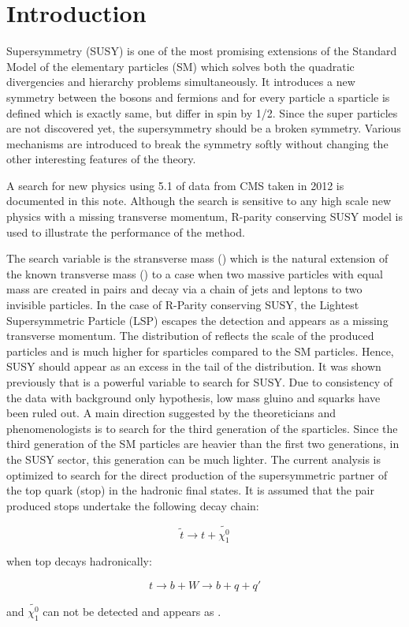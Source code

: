 \section{Introduction}
\label{sect:introduction}
Supersymmetry \cite{Martin:1997ns} (SUSY) is one of the most promising extensions of the 
Standard Model of the elementary particles (SM) which solves both the 
quadratic divergencies and hierarchy problems simultaneously. It introduces a new symmetry between the bosons and fermions and 
for every particle a sparticle is defined which is exactly same, but differ in spin by 1/2.
Since the super particles are not discovered yet, the supersymmetry should be a broken symmetry. Various mechanisms are introduced to 
break the symmetry softly without changing the other interesting features of the theory.

A search for new physics using 5.1 \invfb of data from CMS taken in 2012 is documented in this note. Although the search is sensitive to any high scale 
new physics with a missing transverse momentum, R-parity conserving SUSY model is used to illustrate the performance of the method.

The search variable is the stransverse mass (\mttwo) which is the natural extension of the known transverse mass (\mt) to a case 
when two massive particles with equal mass are created in pairs and decay via a chain of jets and leptons to two invisible particles. 
In the case of R-Parity conserving SUSY, the Lightest Supersymmetric Particle (LSP) escapes the detection and appears as 
a missing transverse momentum.
The distribution of \mttwo reflects the scale of the produced particles and is much higher for sparticles
compared to the SM particles. Hence, SUSY should appear as an excess in the tail of the \mttwo distribution.
It was shown previously \cite{MT2_2011} that \mttwo is a powerful variable to search for SUSY. Due to consistency of the data with background 
only hypothesis, low mass gluino and squarks have been ruled out. A main direction suggested by the theoreticians and phenomenologists is to 
search for the third generation of the sparticles.%
Since the third generation of the SM particles are heavier than the first two generations, 
in the SUSY sector, this generation can be much lighter. The current analysis is optimized to search for the direct production of 
the supersymmetric partner of the top quark (stop) in the hadronic final states. It is assumed that the pair produced stops undertake the 
following decay chain:
\begin{linenomath}
\begin{equation}
\tilde{t} \rightarrow t + \tilde{\chi_{1}^{0}}
\end{equation}
\end{linenomath}
when top decays hadronically:
\begin{linenomath}
\begin{equation}
t \rightarrow b + W \rightarrow b + q + q'
\end{equation}
\end{linenomath}
and $\tilde{\chi_{1}^{0}}$ can not be detected and appears as \met.

